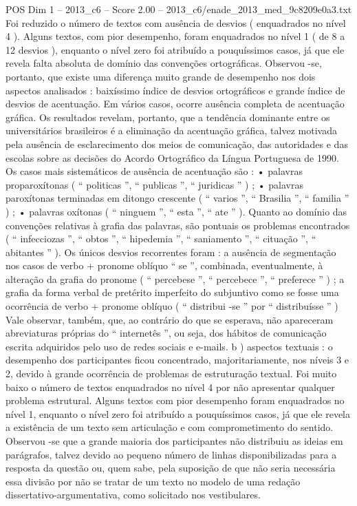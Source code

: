 \begin{textsample}{POS Dim 1 – 2013\_c6 – Score 2.00 – 2013\_c6/enade\_2013\_med\_9c8209e0a3.txt}
Foi reduzido o número de textos com ausência de desvios ( enquadrados no nível 4 ).
Alguns textos, com pior desempenho, foram enquadrados no nível 1 ( de 8 a 12 desvios ), enquanto o nível zero foi atribuído a pouquíssimos casos, já que ele revela falta absoluta de domínio das convenções ortográficas.
Observou -se, portanto, que existe uma diferença muito grande de desempenho nos dois aspectos analisados : baixíssimo índice de desvios ortográficos e grande índice de desvios de acentuação.
Em vários casos, ocorre ausência completa de acentuação gráfica.
Os resultados revelam, portanto, que a tendência dominante entre os universitários brasileiros é a eliminação da acentuação gráfica, talvez motivada pela ausência de esclarecimento dos meios de comunicação, das autoridades e das escolas sobre as decisões do Acordo Ortográfico da Língua Portuguesa de 1990.
Os casos mais sistemáticos de ausência de acentuação são : • palavras proparoxítonas ( “ politicas ”, “ publicas ”, “ juridicas ” ) ; • palavras paroxítonas terminadas em ditongo crescente ( “ varios ”, “ Brasilia ”, “ familia ” ) ; • palavras oxítonas ( “ ninguem ”, “ esta ”, “ ate ” ).
Quanto ao domínio das convenções relativas à grafia das palavras, são pontuais os problemas encontrados ( “ infecciozas ”, “ obtos ”, “ hipedemia ”, “ saniamento ”, “ cituação ”, “ abitantes ” ).
Os únicos desvios recorrentes foram : a ausência de segmentação nos casos de verbo + pronome oblíquo “ se ”, combinada, eventualmente, à alteração da grafia do pronome ( “ percebese ”, “ percebece ”, “ preferece ” ) ; a grafia da forma verbal de pretérito imperfeito do subjuntivo como se fosse uma ocorrência de verbo + pronome oblíquo ( “ distribui -se ” por “ distribuísse ” ) Vale observar, também, que, ao contrário do que se esperava, não apareceram abreviaturas próprias do “ internetês ”, ou seja, dos hábitos de comunicação escrita adquiridos pelo uso de redes sociais e e-mails. b ) aspectos textuais : o desempenho dos participantes ficou concentrado, majoritariamente, nos níveis 3 e 2, devido à grande ocorrência de problemas de estruturação textual.
Foi muito baixo o número de textos enquadrados no nível 4 por não apresentar qualquer problema estrutural.
Alguns textos com pior desempenho foram enquadrados no nível 1, enquanto o nível zero foi atribuído a pouquíssimos casos, já que ele revela a existência de um texto sem articulação e com comprometimento do sentido.
Observou -se que a grande maioria dos participantes não distribuiu as ideias em parágrafos, talvez devido ao pequeno número de linhas disponibilizadas para a resposta da questão ou, quem sabe, pela suposição de que não seria necessária essa divisão por não se tratar de um texto no modelo de uma redação dissertativo-argumentativa, como solicitado nos vestibulares.

\end{textsample}
